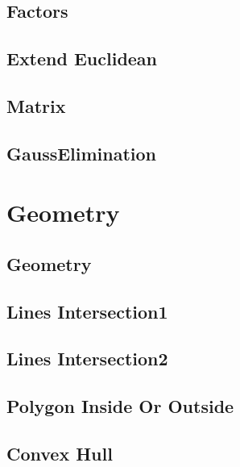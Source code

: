 \subsection{Factors}


\subsection{Extend Euclidean}


\subsection{Matrix}



\subsection{GaussElimination}

\section{Geometry}

\subsection{Geometry}


\subsection{Lines Intersection1}


\subsection{Lines Intersection2}


\subsection{Polygon Inside Or Outside}


\subsection{Convex Hull}

